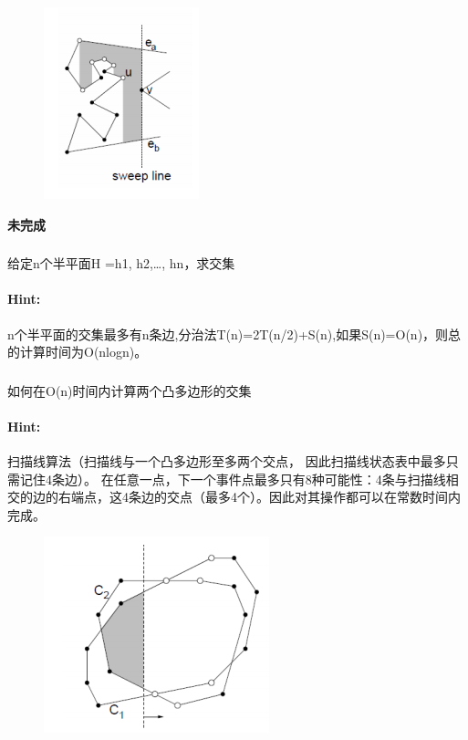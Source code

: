 \documentclass{article}
\begin{document}
        \begin{figure}[h]
 	\centering
 	\includegraphics[scale=0.6]{dandiao.png}
    \end{figure}
     \textbf{未完成}
     
     \subsubsection{}给定n个半平面H ={h1, h2,…, hn}，求交集\\
     \paragraph{Hint:}n个半平面的交集最多有n条边,分治法T(n)=2T(n/2)+S(n),如果S(n)=O(n)，则总的计算时间为O(nlogn)。
     
     \subsubsection{} 如何在O(n)时间内计算两个凸多边形的交集 
\paragraph{Hint:}扫描线算法（扫描线与一个凸多边形至多两个交点，
因此扫描线状态表中最多只需记住4条边）。
在任意一点，下一个事件点最多只有8种可能性：4条与扫描线相交的边的右端点，这4条边的交点（最多4个）。因此对其操作都可以在常数时间内完成。
     
     \begin{figure}[h]
 	\centering
 	\includegraphics[scale=0.6]{tujiaoji.png}
    \end{figure}
    
\end{document}
